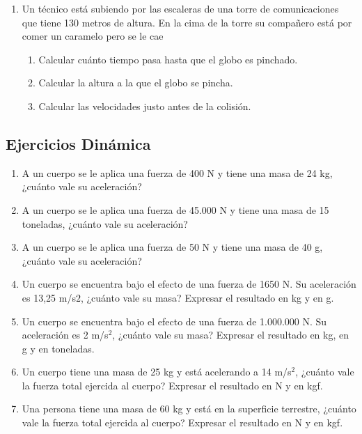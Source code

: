 \begin{enumerate}
\item Un técnico está subiendo por las escaleras de una torre de comunicaciones que tiene 130 metros de altura. En la cima de la torre su compañero está por comer un caramelo pero se le cae
\begin{enumerate}
    \item Calcular cuánto tiempo pasa hasta que el
    globo es pinchado.
    \item Calcular la altura a la que el globo se pincha.
    \item Calcular las velocidades justo antes de la colisión.
\end{enumerate}
\end{enumerate}

\subsection*{Ejercicios Dinámica}

\begin{enumerate}
\item A un cuerpo se le aplica una fuerza de 400 N y tiene una masa de 24 kg, ¿cuánto vale su aceleración?

\item A un cuerpo se le aplica una fuerza de 45.000 N y tiene una masa de 15 toneladas, ¿cuánto vale su aceleración?

\item A un cuerpo se le aplica una fuerza de 50 N y tiene una masa de 40 g, ¿cuánto vale su aceleración?

\item Un cuerpo se encuentra bajo el efecto de una fuerza de 1650 N. Su aceleración es 13,25 m/s$2$, ¿cuánto vale su masa? Expresar el resultado en kg y en g. %

\item Un cuerpo se encuentra bajo el efecto de una fuerza de 1.000.000 N. Su aceleración es 2 m/s$^2$, ¿cuánto vale su masa? Expresar el resultado en kg, en g y en toneladas. %

\item Un cuerpo tiene una masa de 25 kg y está acelerando a 14 m/s$^2$, ¿cuánto vale la fuerza total ejercida al cuerpo? Expresar el resultado en N y en kgf. %


\item Una persona tiene una masa de 60 kg y está en la superficie terrestre, ¿cuánto vale la fuerza total ejercida al cuerpo? Expresar el resultado en N y en kgf. %

\end{enumerate}


